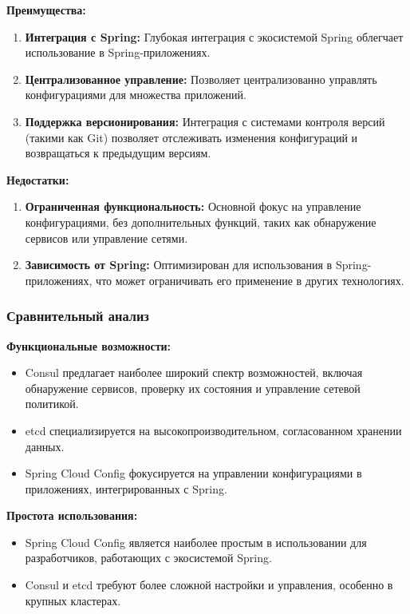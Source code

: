 \textbf{Преимущества:}
\begin{enumerate}[label=\arabic*.]
    \item \textbf{Интеграция с Spring:} Глубокая интеграция с экосистемой Spring облегчает использование в Spring-приложениях.
    \item \textbf{Централизованное управление:} Позволяет централизованно управлять конфигурациями для множества приложений.
    \item \textbf{Поддержка версионирования:} Интеграция с системами контроля версий (такими как Git) позволяет отслеживать изменения конфигураций и возвращаться к предыдущим версиям.
\end{enumerate}

\textbf{Недостатки:}
\begin{enumerate}[label=\arabic*.]
    \item \textbf{Ограниченная функциональность:} Основной фокус на управление конфигурациями, без дополнительных функций, таких как обнаружение сервисов или управление сетями.
    \item \textbf{Зависимость от Spring:} Оптимизирован для использования в Spring-приложениях, что может ограничивать его применение в других технологиях.
\end{enumerate}

\subsubsection{Сравнительный анализ}

\textbf{Функциональные возможности:}
\begin{itemize}
    \item Consul предлагает наиболее широкий спектр возможностей, включая обнаружение сервисов, проверку их состояния и управление сетевой политикой.
    \item etcd специализируется на высокопроизводительном, согласованном хранении данных.
    \item Spring Cloud Config фокусируется на управлении конфигурациями в приложениях, интегрированных с Spring.
\end{itemize}

\textbf{Простота использования:}
\begin{itemize}
    \item Spring Cloud Config является наиболее простым в использовании для разработчиков, работающих с экосистемой Spring.
    \item Consul и etcd требуют более сложной настройки и управления, особенно в крупных кластерах.
\end{itemize}

